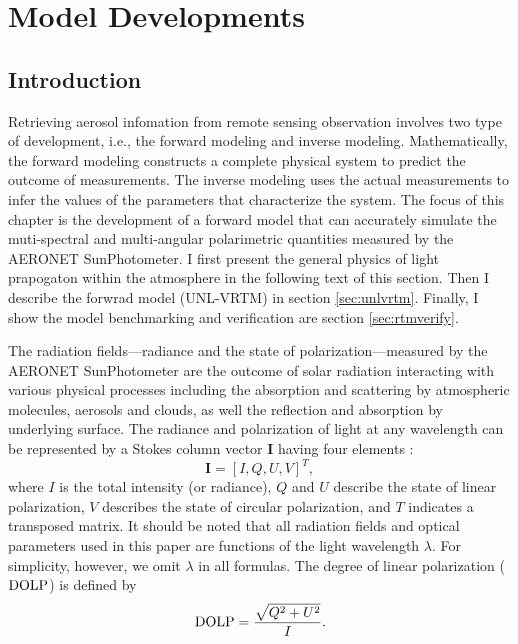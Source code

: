 \chapter{Model Developments} \label{ch:model}

\section{Introduction}

Retrieving aerosol infomation from remote sensing observation
involves two type of development, i.e., the forward modeling and inverse
modeling. Mathematically, the forward modeling constructs a complete
physical system to predict the outcome of measurements. The inverse
modeling uses the actual measurements to infer the values of the
parameters that characterize the system. The focus of this chapter is
the development of a forward model that can accurately simulate the
muti-spectral and multi-angular polarimetric quantities measured by the
AERONET SunPhotometer. I first present the general physics of light 
prapogaton within the atmosphere in the following text of this section. 
Then I describe the forwrad model (UNL-VRTM) in section
\ref{sec:unlvrtm}. Finally, I show the model benchmarking and verification are
section \ref{sec:rtmverify}.

The radiation fields---radiance and the state of polarization---measured by the
AERONET SunPhotometer are the outcome of solar radiation interacting
with various physical processes including the absorption and
scattering by atmospheric molecules, aerosols and clouds, as well the
reflection and absorption by underlying surface. 
The radiance and polarization of light at any wavelength can be represented by
a Stokes column vector $\mathbf{I}$ having four elements \citep{Hansen74}:
\begin{equation}
\mathbf{I} = [I,Q,U,V]^T,
\end{equation}
where $I$ is the total intensity (or radiance), $Q$ and $U$ describe the state of
linear polarization, $V$ describes the state of circular polarization, and $T$
indicates a transposed matrix. It should be noted that all radiation fields and
optical parameters used in this paper are functions of the light wavelength
$\lambda$. For simplicity, however, we omit $\lambda$ in all formulas. 
The degree of linear polarization ($\text{DOLP}$) is defined by
\begin{equation}
\text{DOLP} = \frac{\sqrt{Q^2+U^2}}{I}. \label{eq:dolp}
\end{equation}

